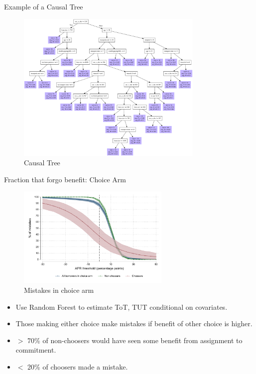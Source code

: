 \documentclass[8pt]{beamer}
\begin{document}
\begin{frame}{Example of a Causal Tree}

    \begin{figure}
        \caption{Causal Tree}
        \centering
\includegraphics[width=0.8\textwidth]{Figuras/crf_apr.pdf}
        \end{figure}

\end{frame}





\begin{frame}{Fraction that forgo benefit:  Choice Arm}


    
    
        \begin{figure}
        \caption{Mistakes in choice arm}
        \centering
        \includegraphics[width=0.65\textwidth]{Figuras/line_cw_apr_tot_tut.pdf}
        \end{figure}

\begin{itemize}
    \item   Use Random Forest to estimate ToT, TUT conditional on covariates.
    \item   Those making either choice make mistakes if benefit of other choice is higher.
    \item $>$ 70\% of non-choosers would have seen some benefit from assignment to commitment.
    \item  $<$ 20\% of choosers made a mistake.
\end{itemize}        


\end{frame}
\end{document}
